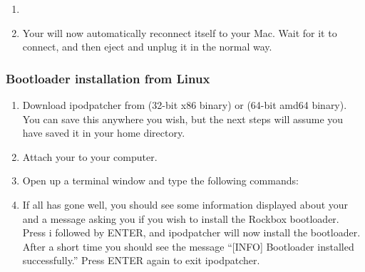 {\begin{enumerate}
\item {}

\item Your \dap{} will now automatically reconnect itself to your Mac.
Wait for it to connect, and then eject and unplug it in the normal way.

\end{enumerate}

\subsubsection{Bootloader installation from Linux}

\begin{enumerate}

\item Download ipodpatcher from
 (32-bit x86
binary) or 
(64-bit amd64 binary). You can save this anywhere you wish, but the next
steps will assume you have saved it in your home directory.

\item Attach your \dap{} to your computer.

\item Open up a terminal window and type the following commands:



\item If all has gone well, you should see some information displayed about
your \dap{} and a message asking you if you wish to install the Rockbox
bootloader. Press i followed by ENTER, and ipodpatcher will now install the
bootloader. After a short time you should see the message ``[INFO] Bootloader
installed successfully.'' Press ENTER again to exit ipodpatcher.

\end{enumerate}}

